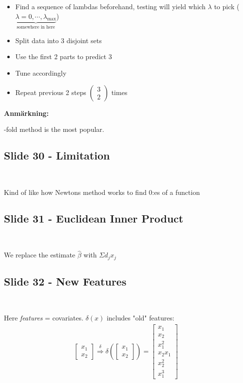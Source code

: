\begin{itemize}
  \item Find a sequence of lambdas beforehand, testing will yield which $\lambda$ to pick ($\underbrace{\lambda = 0,\cdots,\lambda_{\text{max}}}_{\text{somewhere in here}}$)
  \item Split data into 3 disjoint sets
  \item Use the first 2 parts to predict 3
  \item Tune accordingly
  \item Repeat previous 2 steps $\begin{pmatrix}3\\2\end{pmatrix}$ times
\end{itemize}
\par\bigskip
\noindent\textbf{Anmärkning:}\par
{}-fold method is the most popular. 
\par\bigskip
\subsection{Slide 30 - Limitation}\hfill\\\par
\noindent Kind of like how Newtons method works to find 0:es of a function
\par\bigskip
\subsection{Slide 31 - Euclidean Inner Product}\hfill\\\par
\noindent We replace the estimate $\widehat{\beta}$ with $\Sigma d_jx_j$ 
\par\bigskip
\subsection{Slide 32 - New Features}\hfill\\\par
\noindent Here \textit{features}  = covariates. $\delta(x)$ includes "old" features:
\begin{equation*}
  \begin{gathered}
    \begin{bmatrix}x_1\\x_2\end{bmatrix}\stackrel{\delta}{\Rightarrow}\delta\left(\begin{bmatrix}x_1\\x_2\end{bmatrix}\right) = \begin{bmatrix}x_1\\x_2\\x_1^2\\x_2x_1\\x_2^2\\x_1^3\end{bmatrix}
  \end{gathered}
\end{equation*}
\par\bigskip
